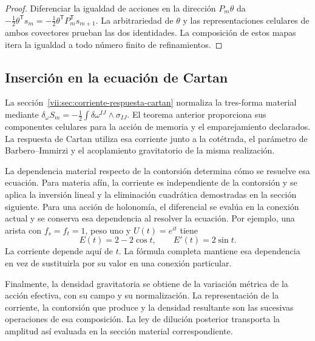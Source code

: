 \begin{proof}
Diferenciar la igualdad de acciones en la dirección
\(P_m\theta\) da
\(-\tfrac12\theta^{\mathsf T}s_m
 =-\tfrac12\theta^{\mathsf T}P_m^{\mathsf T}s_{m+1}\).
La arbitrariedad de \(\theta\) y las representaciones celulares
de ambos covectores prueban las dos identidades. La composición de
estos mapas itera la igualdad a todo número finito de refinamientos.
\end{proof}

\subsection{Inserción en la ecuación de Cartan}

La sección~\ref{vii:sec:corriente-respuesta-cartan} normaliza la
tres-forma material mediante
\(\delta_\omega S_m=-\tfrac12\int\delta\omega^{IJ}\wedge
\sigma_{IJ}\). El teorema anterior proporciona sus componentes
celulares para la acción de memoria y el emparejamiento declarados.
La respuesta de Cartan utiliza esa corriente junto a la cotétrada,
el parámetro de Barbero--Immirzi y el acoplamiento gravitatorio de la
misma realización.

La dependencia material respecto de la contorsión determina cómo se
resuelve esa ecuación. Para materia afín, la corriente es independiente
de la contorsión y se aplica la inversión lineal y la eliminación
cuadrática demostradas en la sección siguiente. Para una acción de
holonomía, el diferencial se evalúa en la conexión actual y se conserva
esa dependencia al resolver la ecuación. Por ejemplo, una arista con
\(f_s=f_t=1\), peso uno y \(U(t)=e^{it}\) tiene
\[
 E(t)=2-2\cos t,\qquad E'(t)=2\sin t.
\]
La corriente depende aquí de \(t\). La fórmula completa mantiene
esa dependencia en vez de sustituirla por su valor en una conexión
particular.

Finalmente, la densidad gravitatoria se obtiene de la variación
métrica de la acción efectiva, con su campo y su normalización.
La representación de la corriente, la contorsión que produce y la
densidad resultante son las sucesivas operaciones de esa composición.
La ley de dilución posterior transporta la amplitud así evaluada en
la sección material correspondiente.
